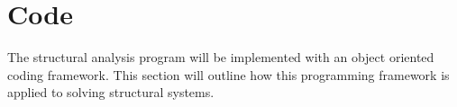 \section{Code}

The structural analysis program will be implemented with an object oriented coding framework. This section will outline how this programming framework is applied to solving structural systems.



	




